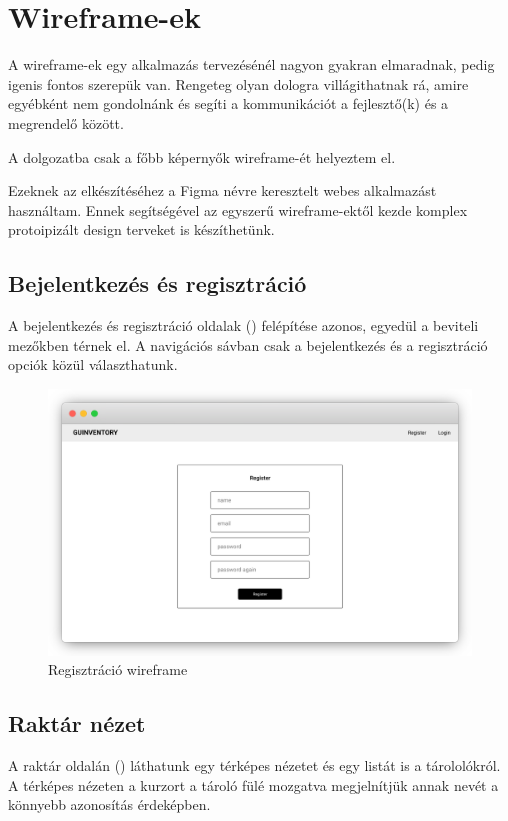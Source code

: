 \chapter{Wireframe-ek}

A wireframe-ek egy alkalmazás tervezésénél nagyon gyakran elmaradnak, pedig igenis fontos szerepük van.
Rengeteg olyan dologra villágithatnak rá, amire egyébként nem gondolnánk és segíti a kommunikációt a fejlesztő(k) és a megrendelő között.

A dolgozatba csak a főbb képernyők wireframe-ét helyeztem el.

Ezeknek az elkészítéséhez a Figma névre keresztelt webes alkalmazást használtam. 
Ennek segítségével az egyszerű wireframe-ektől kezde komplex protoipizált design terveket is készíthetünk.

\section{Bejelentkezés és regisztráció}
A bejelentkezés és regisztráció oldalak () felépítése azonos, egyedül a beviteli mezőkben térnek el.
A navigációs sávban csak a bejelentkezés és a regisztráció opciók közül választhatunk.
\begin{figure}[!ht]
  \centering
  \includegraphics[width=150mm, keepaspectratio]{figures/wireframes/frame_registration.png}
  \caption{Regisztráció wireframe}
  \label{fig:RegistrationWireframe}
\end{figure}


\section{Raktár nézet}
A raktár oldalán () láthatunk egy térképes nézetet és egy listát is a tárololókról. 
A térképes nézeten a kurzort a tároló fülé mozgatva megjelnítjük annak nevét a könnyebb azonosítás érdeképben.


